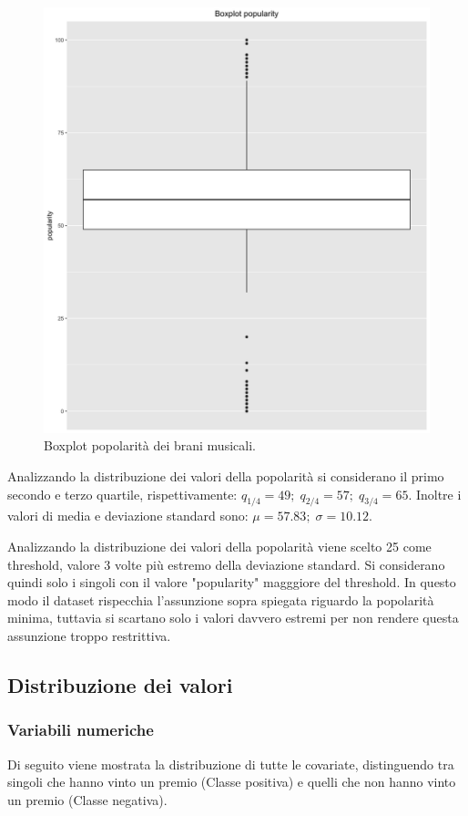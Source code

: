 \begin{figure}[H]
\centering
\includegraphics[width=13cm]{../images/popularity_boxplot.png}
\caption{Boxplot popolarità dei brani musicali.}
\end{figure}

Analizzando la distribuzione dei valori della popolarità si considerano il primo secondo e terzo quartile, rispettivamente: $q_{1/4} = 49; \; q_{2/4}= 57; \; q_{3/4} = 65$. Inoltre i valori di media e deviazione standard sono: $\mu = 57.83; \; \sigma = 10.12$.

Analizzando la distribuzione dei valori della popolarità viene scelto 25 come threshold, valore 3 volte più estremo della deviazione standard. Si considerano quindi solo i singoli con il valore "popularity" magggiore del threshold. In questo modo il dataset rispecchia l'assunzione sopra spiegata riguardo la popolarità minima, tuttavia si scartano solo i valori davvero estremi per non rendere questa assunzione troppo restrittiva.

\subsection{Distribuzione dei valori}
\subsubsection{Variabili numeriche}
Di seguito viene mostrata la distribuzione di tutte le covariate, distinguendo tra singoli che hanno vinto un premio (Classe positiva) e quelli che non hanno vinto un premio (Classe negativa).

